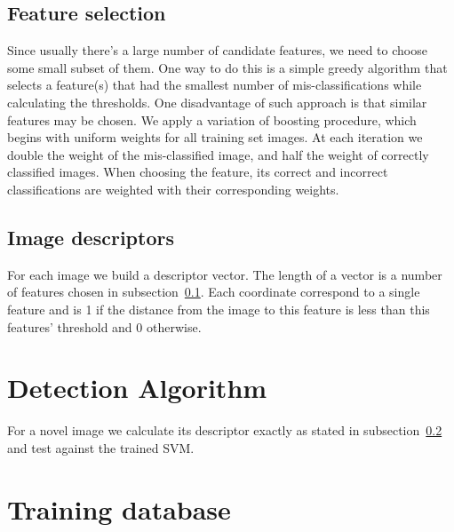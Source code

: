 \documentclass[12pt]{article}
\begin{document}
\subsection{Feature selection}\label{feat_sel}
Since usually there's a large number of candidate features, we need to choose some small subset of them.  One way to do this is a simple greedy algorithm that selects a feature(s) that had the smallest number of mis-classifications while calculating the thresholds.  One disadvantage of such approach is that similar features may be chosen.  We apply a variation of boosting procedure, which begins with uniform weights for all training set images.  At each iteration we double the weight of the mis-classified image, and half the weight of correctly classified images.  When choosing the feature, its correct and incorrect classifications are weighted with their corresponding weights.
\subsection{Image descriptors}\label{descriptors}
For each image we build a descriptor vector.  The length of a vector is a number of features chosen in subsection~\ref{feat_sel}.  Each coordinate correspond to a single feature and is 1 if the distance from the image to this feature is less than this features' threshold and 0 otherwise.

\section{Detection Algorithm}
For a novel image we calculate its descriptor exactly as stated in subsection~\ref{descriptors} and test against the trained SVM.

\section{Training database}\label{db}
\end{document}
